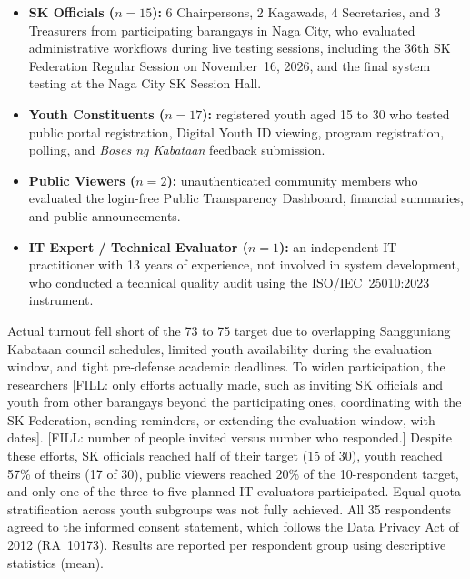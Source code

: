 \begin{itemize}
    \item \textbf{SK Officials ($n = 15$):} 6 Chairpersons, 2 Kagawads, 4 Secretaries, and 3 Treasurers from participating barangays in Naga City, who evaluated administrative workflows during live testing sessions, including the 36th SK Federation Regular Session on November~16, 2026, and the final system testing at the Naga City SK Session Hall.
    \item \textbf{Youth Constituents ($n = 17$):} registered youth aged 15 to 30 who tested public portal registration, Digital Youth ID viewing, program registration, polling, and \textit{Boses ng Kabataan} feedback submission.
    \item \textbf{Public Viewers ($n = 2$):} unauthenticated community members who evaluated the login-free Public Transparency Dashboard, financial summaries, and public announcements.
    \item \textbf{IT Expert / Technical Evaluator ($n = 1$):} an independent IT practitioner with 13 years of experience, not involved in system development, who conducted a technical quality audit using the ISO/IEC~25010:2023 instrument.
\end{itemize}

\hspace*{\parindent}Actual turnout fell short of the 73 to 75 target due to overlapping Sangguniang Kabataan council schedules, limited youth availability during the evaluation window, and tight pre-defense academic deadlines. To widen participation, the researchers [FILL: only efforts actually made, such as inviting SK officials and youth from other barangays beyond the participating ones, coordinating with the SK Federation, sending reminders, or extending the evaluation window, with dates]. [FILL: number of people invited versus number who responded.] Despite these efforts, SK officials reached half of their target (15 of 30), youth reached 57\% of theirs (17 of 30), public viewers reached 20\% of the 10-respondent target, and only one of the three to five planned IT evaluators participated. Equal quota stratification across youth subgroups was not fully achieved. All 35 respondents agreed to the informed consent statement, which follows the Data Privacy Act of 2012 (RA~10173). Results are reported per respondent group using descriptive statistics (mean).
\vspace{5mm}


